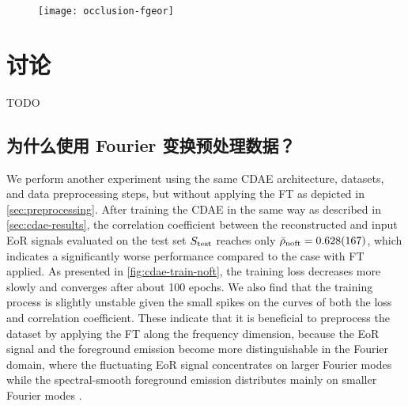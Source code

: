 \begin{figure}[htp]
  \centering
  \texttt{[image: occlusion-fgeor]}
  \label{fig:occ-fgeor}
\end{figure}


\section{讨论}

TODO

\subsection{为什么使用 Fourier 变换预处理数据？}
\label{sec:why-ft}

We perform another experiment using the same CDAE architecture,
datasets, and data preprocessing steps, but without
applying the FT as depicted in \autoref{sec:preprocessing}.
After training the CDAE in the same way as described in
\autoref{sec:cdae-results}, the correlation coefficient between the
reconstructed and input EoR signals evaluated on the test set
$S_{\mathrm{test}}$ reaches only $\bar{\rho}_{\mathrm{noft}} = \num{0.628 +- 0.167}$,
which indicates a significantly worse performance compared to the case with
FT applied.
As presented in \autoref{fig:cdae-train-noft}, the training loss decreases more
slowly and converges after about 100 epochs.
We also find that the training process is slightly unstable given the small
spikes on the curves of both the loss and correlation coefficient.
These indicate that it is beneficial to preprocess the
dataset by applying the FT along the frequency dimension, because the
EoR signal and the foreground emission become more distinguishable
in the Fourier domain, where the fluctuating EoR signal concentrates on
larger Fourier modes while the spectral-smooth foreground emission
distributes mainly on smaller Fourier modes \cite{parsons2012}.

